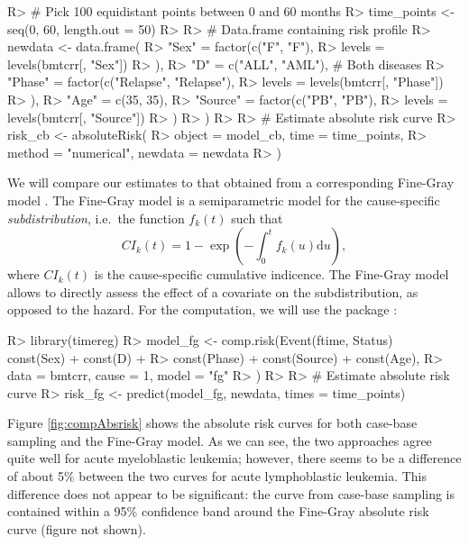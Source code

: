\documentclass[
]{jss}
\begin{document}
\begin{CodeChunk}

\begin{CodeInput}
R> # Pick 100 equidistant points between 0 and 60 months
R> time_points <- seq(0, 60, length.out = 50)
R> 
R> # Data.frame containing risk profile
R> newdata <- data.frame(
R>   "Sex" = factor(c("F", "F"),
R>     levels = levels(bmtcrr[, "Sex"])
R>   ),
R>   "D" = c("ALL", "AML"), # Both diseases
R>   "Phase" = factor(c("Relapse", "Relapse"),
R>     levels = levels(bmtcrr[, "Phase"])
R>   ),
R>   "Age" = c(35, 35),
R>   "Source" = factor(c("PB", "PB"),
R>     levels = levels(bmtcrr[, "Source"])
R>   )
R> )
R> 
R> # Estimate absolute risk curve
R> risk_cb <- absoluteRisk(
R>   object = model_cb, time = time_points,
R>   method = "numerical", newdata = newdata
R> )
\end{CodeInput}
\end{CodeChunk}

We will compare our estimates to that obtained from a corresponding
Fine-Gray model \citeyearpar{fine1999proportional}. The Fine-Gray model
is a semiparametric model for the cause-specific \emph{subdistribution},
i.e.~the function \(f_k(t)\) such that
\[CI_k(t) =1 - \exp\left( - \int_0^t f_k(u) \textrm{d}u \right),\] where
\(CI_k(t)\) is the cause-specific cumulative indicence. The Fine-Gray
model allows to directly assess the effect of a covariate on the
subdistribution, as opposed to the hazard. For the computation, we will
use the  package \citep{timereg}:

\begin{CodeChunk}

\begin{CodeInput}
R> library(timereg)
R> model_fg <- comp.risk(Event(ftime, Status) ~ const(Sex) + const(D) +
R>   const(Phase) + const(Source) + const(Age),
R> data = bmtcrr, cause = 1, model = "fg"
R> )
R> 
R> # Estimate absolute risk curve
R> risk_fg <- predict(model_fg, newdata, times = time_points)
\end{CodeInput}
\end{CodeChunk}

Figure \ref{fig:compAbsrisk} shows the absolute risk curves for both
case-base sampling and the Fine-Gray model. As we can see, the two
approaches agree quite well for acute myeloblastic leukemia; however,
there seems to be a difference of about 5\% between the two curves for
acute lymphoblastic leukemia. This difference does not appear to be
significant: the curve from case-base sampling is contained within a
95\% confidence band around the Fine-Gray absolute risk curve (figure
not shown).
\end{document}

